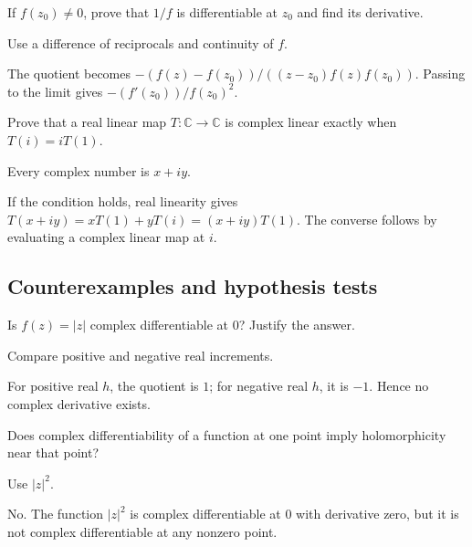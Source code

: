 \begin{exercise}\label{exr:iv01-expand-08}
If \(f(z_0)\ne0\), prove that \(1/f\) is differentiable at \(z_0\) and find its derivative.
\end{exercise}
\begin{hint}
Use a difference of reciprocals and continuity of \(f\).
\end{hint}
\begin{solution}
The quotient becomes \(-(f(z)-f(z_0))/((z-z_0)f(z)f(z_0))\). Passing to the limit gives \(-(f'(z_0))/f(z_0)^2\).
\end{solution}

\begin{exercise}\label{exr:iv01-expand-09}
Prove that a real linear map \(T:\mathbb C\to\mathbb C\) is complex linear exactly when \(T(i)=iT(1)\).
\end{exercise}
\begin{hint}
Every complex number is \(x+iy\).
\end{hint}
\begin{solution}
If the condition holds, real linearity gives \(T(x+iy)=xT(1)+yT(i)=(x+iy)T(1)\). The converse follows by evaluating a complex linear map at \(i\).
\end{solution}

\subsection*{Counterexamples and hypothesis tests}

\begin{exercise}\label{exr:iv01-expand-10}
Is \(f(z)=|z|\) complex differentiable at \(0\)? Justify the answer.
\end{exercise}
\begin{hint}
Compare positive and negative real increments.
\end{hint}
\begin{solution}
For positive real \(h\), the quotient is \(1\); for negative real \(h\), it is \(-1\). Hence no complex derivative exists.
\end{solution}

\begin{exercise}\label{exr:iv01-expand-11}
Does complex differentiability of a function at one point imply holomorphicity near that point?
\end{exercise}
\begin{hint}
Use \(|z|^2\).
\end{hint}
\begin{solution}
No. The function \(|z|^2\) is complex differentiable at \(0\) with derivative zero, but it is not complex differentiable at any nonzero point.
\end{solution}

